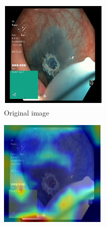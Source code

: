 \begin{figure}[t]
     \centering
     \begin{subfigure}[t]{0.3\textwidth}
         \centering
         \includegraphics[width=\textwidth]{methodology/figures/sal1.png}
         \caption{Original image}
         \label{fig:sal1}
     \end{subfigure}
     \hfill
     \begin{subfigure}[t]{0.3\textwidth}
         \centering
         \includegraphics[width=\textwidth]{methodology/figures/sal2.png}

\end{subfigure}
\end{figure}
